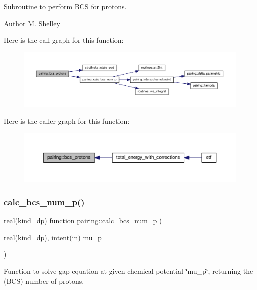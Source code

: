 Subroutine to perform B\+CS for protons. 

\begin{DoxyAuthor}{Author}
M. Shelley 
\end{DoxyAuthor}
Here is the call graph for this function\+:
\nopagebreak
\begin{figure}[H]
\begin{center}
\leavevmode
\includegraphics[width=350pt]{namespacepairing_a693cac2cfa7fcb7ad19984fefe20495c_cgraph}
\end{center}
\end{figure}
Here is the caller graph for this function\+:
\nopagebreak
\begin{figure}[H]
\begin{center}
\leavevmode
\includegraphics[width=350pt]{namespacepairing_a693cac2cfa7fcb7ad19984fefe20495c_icgraph}
\end{center}
\end{figure}
\mbox{\label{namespacepairing_a37440fb2ff0d8a3495d051f3f14c9107}} 
\subsubsection{\texorpdfstring{calc\+\_\+bcs\+\_\+num\+\_\+p()}{calc\_bcs\_num\_p()}}
{\footnotesize\ttfamily real(kind=dp) function pairing\+::calc\+\_\+bcs\+\_\+num\+\_\+p (\begin{DoxyParamCaption}\item[{real(kind=dp), intent(in)}]{mu\+\_\+p }\end{DoxyParamCaption})}



Function to solve gap equation at given chemical potential \char`\"{}mu\+\_\+p\char`\"{}, returning the (B\+CS) number of protons. 

